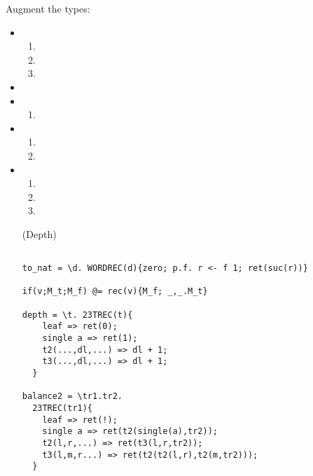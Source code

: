 Augment the types:
\begin{itemize}
\item {} 
  \begin{enumerate}
  \item {}
  \item {}
  \item {}
  \end{enumerate}

\item {}
\item {}
  \begin{enumerate}
  \item {}
  \end{enumerate}
\item {}
  \begin{enumerate}
  \item {}
  \item {}
  \end{enumerate}

\item {}
  \begin{enumerate}
  \item {}
  \item {}
  \item {}
  \end{enumerate} 

\begin{lemma}(Depth)\label{lemma:depth}
\end{lemma}
\begin{verbatim}

to_nat = \d. WORDREC(d){zero; p.f. r <- f 1; ret(suc(r))}

if(v;M_t;M_f) @= rec(v){M_f; _,_.M_t}

depth = \t. 23TREC(t){
    leaf => ret(0);
    single a => ret(1);
    t2(...,dl,...) => dl + 1;
    t3(...,dl,...) => dl + 1;
  }

balance2 = \tr1.tr2.
  23TREC(tr1){
    leaf => ret(!);
    single a => ret(t2(single(a),tr2));
    t2(l,r,...) => ret(t3(l,r,tr2));
    t3(l,m,r...) => ret(t2(t2(l,r),t2(m,tr2)));
  }


\end{verbatim}
\end{itemize}
